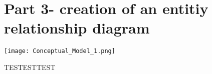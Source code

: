 \documentclass[a4paper]{article}
\begin{document}
\section{Part 3- creation of an entitiy relationship diagram}


\texttt{[image: Conceptual\_Model\_1.png]}



TESTESTTEST
\end{document}
